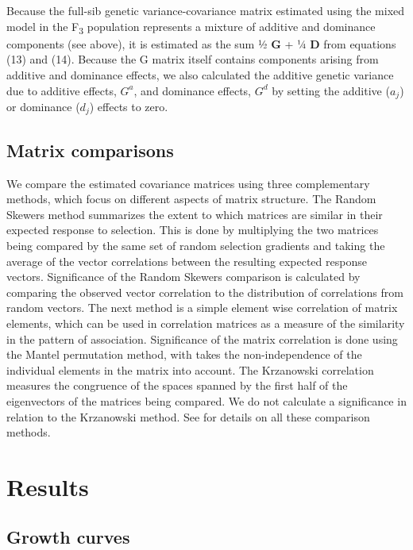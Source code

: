 \begin{refsection}
Because the full-sib genetic variance-covariance matrix estimated using
the mixed model in the F\textsubscript{3} population represents a
mixture of additive and dominance components (see above), it is
estimated as the sum ½ \textbf{G} + ¼ \textbf{D} from equations (13)
and (14). Because the G matrix itself contains components arising from
additive and dominance effects, we also calculated the additive genetic
variance due to additive effects, \(G^{a}\), and dominance effects,
\(G^{d}\) by setting the additive (\(a_{j}\)) or dominance (\(d_{j}\))
effects to zero.

\subsection{Matrix comparisons}

We compare the estimated covariance matrices using three complementary
methods, which focus on different aspects of matrix structure. The
Random Skewers method \parencite{Cheverud2007-yp} summarizes the extent to which matrices are
similar in their expected response to selection. This is done by
multiplying the two matrices being compared by the same set of random
selection gradients and taking the average of the vector correlations
between the resulting expected response vectors. Significance of the
Random Skewers comparison is calculated by comparing the observed vector
correlation to the distribution of correlations from random vectors. The
next method is a simple element wise correlation of matrix elements,
which can be used in correlation matrices as a measure of the similarity
in the pattern of association. Significance of the matrix correlation is
done using the Mantel permutation method, with takes the
non-independence of the individual elements in the matrix into account.
The Krzanowski correlation measures the congruence of the spaces spanned
by the first half of the eigenvectors of the matrices being compared. We
do not calculate a significance in relation to the Krzanowski method.
See \parencite{Melo2015-kf} for details on all these comparison methods.

\section{Results}

\subsection{Growth curves}


\end{refsection}
